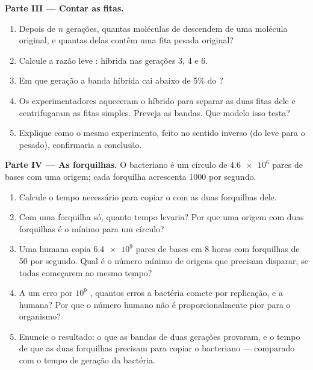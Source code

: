 \begin{problem}
\medskip
\noindent\textbf{Parte III --- Contar as fitas.}
\begin{enumerate}[resume]
  \item Depois de $n$ gerações, quantas moléculas de  descendem de
        uma molécula original, e quantas delas contêm uma fita pesada
        original?
  \item Calcule a razão leve : híbrida nas gerações 3, 4 e 6.
  \item Em que geração a banda híbrida cai abaixo de 5\% do ?
  \item Os experimentadores aqueceram o  híbrido para separar as
        duas fitas dele e centrifugaram as fitas simples. Preveja as
        bandas. Que modelo isso testa?
  \item Explique como o mesmo experimento, feito no sentido inverso
        (do leve para o pesado), confirmaria a conclusão.
\end{enumerate}

\medskip
\noindent\textbf{Parte IV --- As forquilhas.}
O  bacteriano é um círculo de $\num{4.6e6}$ pares de bases
com uma origem; cada forquilha acrescenta 1000  por segundo.
\begin{enumerate}[resume]
  \item Calcule o tempo necessário para copiar o  com as
        duas forquilhas dele.
  \item Com uma forquilha só, quanto tempo levaria? Por que uma origem
        com duas forquilhas é o mínimo para um círculo?
  \item Uma  humana copia $\num{6.4e9}$ pares de bases em 8 horas
        com forquilhas de 50  por segundo. Qual é o número
        mínimo de origens que precisam disparar, se todas começarem ao
        mesmo tempo?
  \item A um erro por $10^9$ , quantos erros a bactéria
        comete por replicação, e a  humana? Por que o número
        humano não é proporcionalmente pior para o organismo?
  \item Enuncie o resultado: o que as bandas de duas gerações
        provaram, e o tempo de que as duas forquilhas precisam para
        copiar o  bacteriano --- comparado com o tempo de
        geração da bactéria.
\end{enumerate}
\end{problem}
